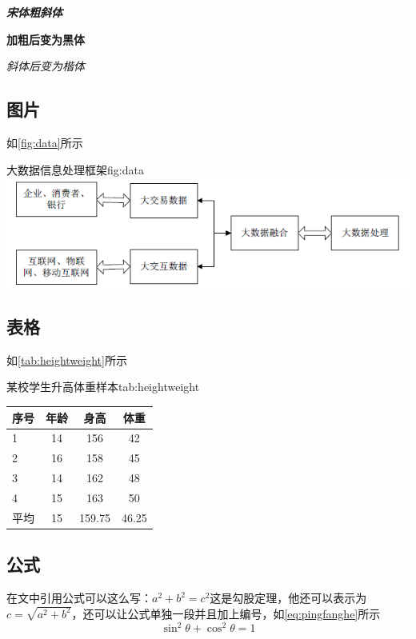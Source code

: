 \documentclass[supercite]{HustGSReport}
\begin{document}
{\songti \bfseries \itshape 宋体粗斜体}

{\bfseries 加粗后变为黑体}
	
{\itshape 斜体后变为楷体}

\subsection{图片}

如\autoref{fig:data}所示

\begin{generalfig}[htb]{大数据信息处理框架}{fig:data}
    \includegraphics[width=\textwidth]{Figures/data.png}
\end{generalfig}

\subsection{表格}

如\autoref{tab:heightweight}所示
\begin{generaltab}{某校学生升高体重样本}{tab:heightweight}
    \begin{tabularx}{\textwidth}{lCCC}
        \toprule
        序号&年龄&身高&体重\\
        &14&156&42\\
        2&16&158&45\\
        3&14&162&48\\
        4&15&163&50\\
        平均&15&159.75&46.25\\
        \bottomrule
    \end{tabularx}
\end{generaltab}


\subsection{公式}
在文中引用公式可以这么写：$a^2+b^2=c^2$这是勾股定理，他还可以表示为$c=\sqrt{a^2+b^2}$，还可以让公式单独一段并且加上编号，如\autoref{eq:pingfanghe}所示
\begin{equation}
	\sin^2{\theta}+\cos^2{\theta}=1 
    \label{eq:pingfanghe}
\end{equation}
\end{document}
